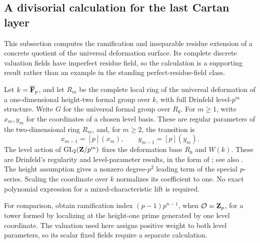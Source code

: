 \subsection{A divisorial calculation for the last Cartan layer}\label{sec:divisorial-cartan}
This subsection computes the ramification and inseparable residue extension of a concrete quotient of the universal deformation surface. Its complete discrete valuation fields have imperfect residue field, so the calculation is a supporting result rather than an example in the standing perfect-residue-field class.

Let $k=\overline{\mathbf F}_p$, and let $R_m$ be the complete local ring of the universal deformation of a one-dimensional height-two formal group over $k$, with full Drinfeld level-$p^m$ structure. Write $G$ for the universal formal group over $R_0$. For $m\ge1$, write $x_m,y_m$ for the coordinates of a chosen level basis. These are regular parameters of the two-dimensional ring $R_m$, and, for $m\ge2$, the transition is
\[
 x_{m-1}=[p](x_m),\qquad y_{m-1}=[p](y_m).
\]
The level action of $\operatorname{GL}_2(\mathbf Z/p^m)$ fixes the deformation base $R_0$ and $W(k)$. These are Drinfeld's regularity and level-parameter results, in the form of \citet[Theorem~2.1.2 and its proof, pp.~9--11; \S2.2, pp.~12--14]{Strauch2006}; see also \citet[Theorem~2.1.2, p.~437; Proposition~2.2.3(i), p.~439]{CarterStrauch2021}. The height assumption gives a nonzero degree-$p^2$ leading term of the special $p$-series. Scaling the coordinate over $k$ normalizes its coefficient to one. No exact polynomial expression for a mixed-characteristic lift is required.

For comparison, \citet[Section~2.2.8 and Corollary~2.2.9, p.~443]{CarterStrauch2021} obtain ramification index $(p-1)p^{n-1}$, when $\mathcal O=\mathbf Z_p$, for a tower formed by localizing at the height-one prime generated by one level coordinate. The valuation used here assigns positive weight to both level parameters, so its scalar fixed fields require a separate calculation.

